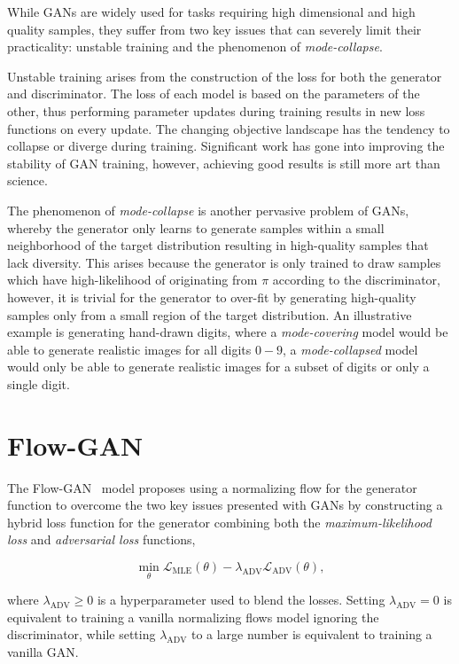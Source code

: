 While GANs are widely used for tasks requiring high dimensional and high quality samples, they suffer from two key
issues that can severely limit their practicality: unstable training and the phenomenon of \textit{mode-collapse}.

Unstable training arises from the construction of the loss for both the generator and discriminator.
The loss of each model is based on the parameters of the other, thus performing parameter updates during training
results in new loss functions on every update.
The changing objective landscape has the tendency to collapse or diverge during training.
Significant work has gone into improving the stability of GAN training, however, achieving good results is still more
art than science.

The phenomenon of \textit{mode-collapse} is another pervasive problem of GANs, whereby the generator only learns to
generate samples within a small neighborhood of the target distribution resulting in high-quality samples that lack
diversity.
This arises because the generator is only trained to draw samples which have high-likelihood of originating from $\pi$
according to the discriminator, however, it is trivial for the generator to over-fit by generating high-quality samples
only from a small region of the target distribution.
An illustrative example is generating hand-drawn digits, where a \textit{mode-covering} model would be able to generate
realistic images for all digits $0-9$, a \textit{mode-collapsed} model would only be able to generate realistic images
for a subset of digits or only a single digit.

\section{Flow-GAN}\label{sec:flow-gan}

The Flow-GAN~\cite{flow_gan} model proposes using a normalizing flow for the generator function to overcome the two
key issues presented with GANs by constructing a hybrid loss function for the generator combining both the
\textit{maximum-likelihood loss} and \textit{adversarial loss} functions,

\begin{equation*}
    \min_{\theta} \mathcal{L}_{\text{MLE}}(\theta) - \lambda_{\text{ADV}} \mathcal{L}_{\text{ADV}}(\theta),
    \label{eq:flowgan_loss}
\end{equation*}

where $\lambda_{\text{ADV}} \geq 0$ is a hyperparameter used to blend the losses.
Setting $\lambda_{\text{ADV}} = 0$ is equivalent to training a vanilla normalizing flows model ignoring the discriminator,
while setting $\lambda_{\text{ADV}}$ to a large number is equivalent to training a vanilla GAN\@.


